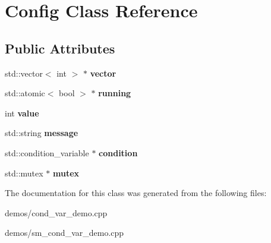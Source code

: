 \hypertarget{classConfig}{}\section{Config Class Reference}
\label{classConfig}
\subsection*{Public Attributes}
\begin{DoxyCompactItemize}
\item 
\mbox{\label{classConfig_a090beefb5d61fbeb32fc116b32df30d7}} 
std\+::vector$<$ int $>$ $\ast$ {\bfseries vector}
\item 
\mbox{\label{classConfig_a32ce04a94d39445c2c35dc28e03006ef}} 
std\+::atomic$<$ bool $>$ $\ast$ {\bfseries running}
\item 
\mbox{\label{classConfig_a0ed2027733c661de1fae2dbe70146ab4}} 
int {\bfseries value}
\item 
\mbox{\label{classConfig_a05d75fea9600b821909ef25e947b3167}} 
std\+::string {\bfseries message}
\item 
\mbox{\label{classConfig_aa701cf3ea7f432c2879698446754d320}} 
std\+::condition\+\_\+variable $\ast$ {\bfseries condition}
\item 
\mbox{\label{classConfig_abacf2bdd32d425c995c2ba5b16a896bd}} 
std\+::mutex $\ast$ {\bfseries mutex}
\end{DoxyCompactItemize}


The documentation for this class was generated from the following files\+:\begin{DoxyCompactItemize}
\item 
demos/cond\+\_\+var\+\_\+demo.\+cpp\item 
demos/sm\+\_\+cond\+\_\+var\+\_\+demo.\+cpp\end{DoxyCompactItemize}
